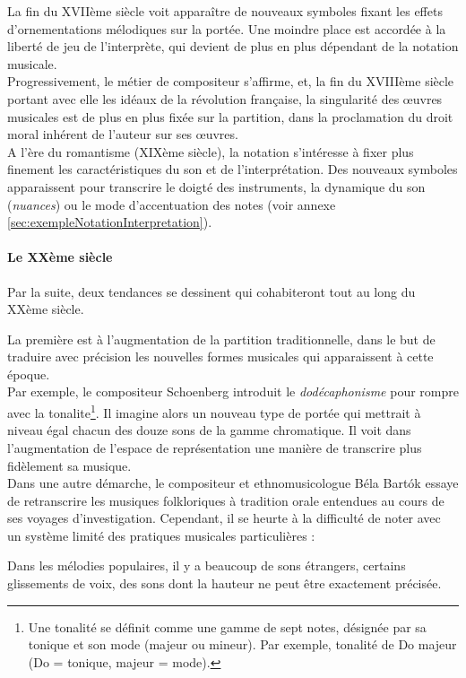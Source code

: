La fin du XVIIème siècle voit apparaître de nouveaux symboles fixant les effets d'ornementations mélodiques sur la portée. Une moindre place est accordée à la liberté de jeu de l'interprète, qui devient de plus en plus dépendant de la notation musicale.\\
Progressivement, le métier de compositeur s'affirme, et, la fin du XVIIIème siècle portant avec elle les idéaux de la révolution française, la singularité des œuvres musicales est de plus en plus fixée sur la partition, dans la proclamation du droit moral inhérent de l'auteur sur ses œuvres.\\
A l'ère du romantisme (XIXème siècle), la notation s'intéresse à fixer plus finement les caractéristiques du son et de l'interprétation. Des nouveaux symboles apparaissent pour transcrire le doigté des instruments, la dynamique du son (\textit{nuances}) ou le mode d'accentuation des notes (voir annexe \ref{sec:exempleNotationInterpretation}).

\paragraph{Le XXème siècle} Par la suite, deux tendances se dessinent qui cohabiteront tout au long du XXème siècle. 

La première est à l'augmentation de la partition traditionnelle, dans le but de traduire avec précision les nouvelles formes musicales qui apparaissent à cette époque.\\
Par exemple, le compositeur Schoenberg introduit le \textit{dodécaphonisme} pour rompre avec la \gls{tonalite}\footnote{Une tonalité se définit comme une gamme de sept notes, désignée par sa tonique et son mode (majeur ou mineur). Par exemple, tonalité de Do majeur (Do = tonique, majeur = mode).}. Il imagine alors un nouveau type de portée qui mettrait à niveau égal chacun des douze sons de la gamme chromatique. Il voit dans l'augmentation de l'espace de représentation une manière de transcrire plus fidèlement sa musique.\\
Dans une autre démarche, le compositeur et ethnomusicologue Béla Bart\'{o}k essaye de retranscrire les musiques folkloriques à tradition orale entendues au cours de ses voyages d'investigation.
Cependant, il se heurte à la difficulté de noter avec un système limité des pratiques musicales particulières :

\begin{displayquote}
\og Dans les mélodies populaires, il y a beaucoup de sons étrangers, certains glissements de voix, des sons dont la hauteur ne peut être exactement précisée.\fg 
\end{displayquote}

